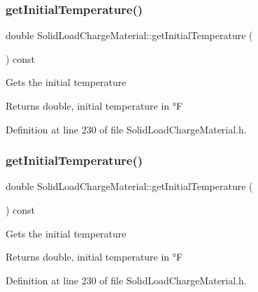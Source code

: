 \subsubsection{\texorpdfstring{get\+Initial\+Temperature()}{getInitialTemperature()}\hspace{0.1cm}{\footnotesize\ttfamily [1/3]}}
{\footnotesize\ttfamily double Solid\+Load\+Charge\+Material\+::get\+Initial\+Temperature (\begin{DoxyParamCaption}{ }\end{DoxyParamCaption}) const\hspace{0.3cm}{\ttfamily [inline]}}

Gets the initial temperature \begin{DoxyReturn}{Returns}
double, initial temperature in °F 
\end{DoxyReturn}


Definition at line 230 of file Solid\+Load\+Charge\+Material.\+h.

\mbox{\label{class_solid_load_charge_material_ae5d7f198fb1d4a3adb0cfc911a13ea06}} 
\subsubsection{\texorpdfstring{get\+Initial\+Temperature()}{getInitialTemperature()}\hspace{0.1cm}{\footnotesize\ttfamily [2/3]}}
{\footnotesize\ttfamily double Solid\+Load\+Charge\+Material\+::get\+Initial\+Temperature (\begin{DoxyParamCaption}{ }\end{DoxyParamCaption}) const\hspace{0.3cm}{\ttfamily [inline]}}

Gets the initial temperature \begin{DoxyReturn}{Returns}
double, initial temperature in °F 
\end{DoxyReturn}


Definition at line 230 of file Solid\+Load\+Charge\+Material.\+h.

\mbox{\label{class_solid_load_charge_material_ae5d7f198fb1d4a3adb0cfc911a13ea06}} 
